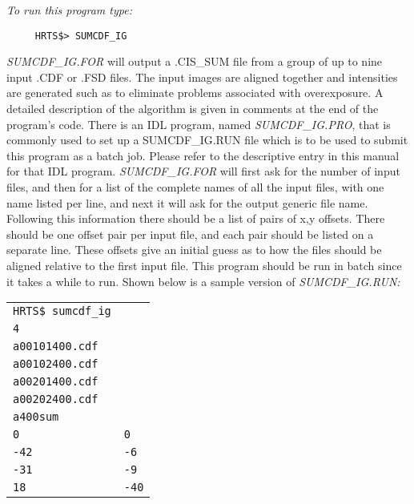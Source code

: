 {\em To run this program type:}
\begin{verbatim}
     HRTS$> SUMCDF_IG
\end{verbatim}
{\em SUMCDF\_IG.FOR} will output a .CIS\_SUM file from a group of up to nine
   input .CDF or .FSD files.  The input images are aligned together and
   intensities are generated such as to eliminate problems associated with
   overexposure.  A detailed description of the algorithm is given in
   comments at the end of the program's code.
      There is an IDL program, named {\it SUMCDF\_IG.PRO}, that is commonly used
   to set up a SUMCDF\_IG.RUN file which is to be used to submit this
   program as a batch job.  Please refer to the descriptive entry in this
   manual for that IDL program.
   {\em SUMCDF\_IG.FOR} will first ask for the number of input files, and then
   for a list of the complete names of all the input files, with one name
   listed per line, and next it will ask for the output generic file name.
   Following this information there should be a list of pairs of {x,y}
   offsets.  There should be one offset pair per input file, and each pair
   should be listed on a separate line.  These offsets give an initial
   guess as to how the files should be aligned relative to the first input
   file.  This program should be run in batch since it takes a while to
   run.  Shown below is a sample version of {\em SUMCDF\_IG.RUN:}
\begin{center}
\begin{tabular}{||l l||}
\hline

                  {\tt HRTS\$ sumcdf\_ig} & \\
                  {\tt 4}   &  \\
                  {\tt a00101400.cdf} & \\
                  {\tt a00102400.cdf} & \\
                  {\tt a00201400.cdf} & \\
                  {\tt a00202400.cdf} & \\
                  {\tt a400sum}       & \\
                    {\tt 0}  &    {\tt 0}  \\
                  {\tt -42}  &   {\tt -6}  \\
                  {\tt -31}  &   {\tt -9}  \\
                   {\tt 18} &    {\tt -40} \\
\hline
\end{tabular}
\end{center}
\newpage

